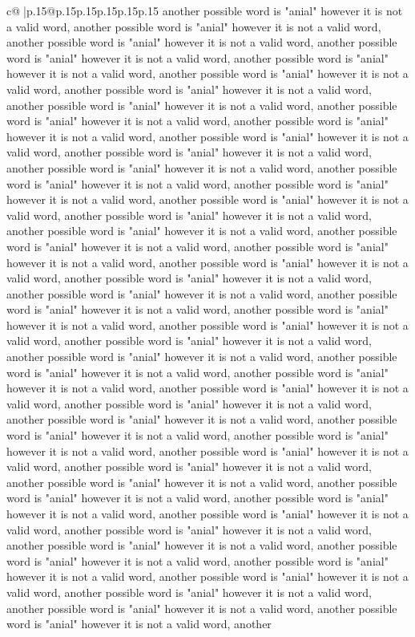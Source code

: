 \documentclass{article}
\begin{document}
{\begin{supertabular}{c@{$\;$}|p{.15\linewidth}@{}p{.15\linewidth}p{.15\linewidth}p{.15\linewidth}p{.15\linewidth}p{.15\linewidth}}
{{{another possible word is "anial" however it is not a valid word, another possible word is "anial" however it is not a valid word, another possible word is "anial" however it is not a valid word, another possible word is "anial" however it is not a valid word, another possible word is "anial" however it is not a valid word, another possible word is "anial" however it is not a valid word, another possible word is "anial" however it is not a valid word, another possible word is "anial" however it is not a valid word, another possible word is "anial" however it is not a valid word, another possible word is "anial" however it is not a valid word, another possible word is "anial" however it is not a valid word, another possible word is "anial" however it is not a valid word, another possible word is "anial" however it is not a valid word, another possible word is "anial" however it is not a valid word, another possible word is "anial" however it is not a valid word, another possible word is "anial" however it is not a valid word, another possible word is "anial" however it is not a valid word, another possible word is "anial" however it is not a valid word, another possible word is "anial" however it is not a valid word, another possible word is "anial" however it is not a valid word, another possible word is "anial" however it is not a valid word, another possible word is "anial" however it is not a valid word, another possible word is "anial" however it is not a valid word, another possible word is "anial" however it is not a valid word, another possible word is "anial" however it is not a valid word, another possible word is "anial" however it is not a valid word, another possible word is "anial" however it is not a valid word, another possible word is "anial" however it is not a valid word, another possible word is "anial" however it is not a valid word, another possible word is "anial" however it is not a valid word, another possible word is "anial" however it is not a valid word, another possible word is "anial" however it is not a valid word, another possible word is "anial" however it is not a valid word, another possible word is "anial" however it is not a valid word, another possible word is "anial" however it is not a valid word, another possible word is "anial" however it is not a valid word, another possible word is "anial" however it is not a valid word, another possible word is "anial" however it is not a valid word, another possible word is "anial" however it is not a valid word, another possible word is "anial" however it is not a valid word, another possible word is "anial" however it is not a valid word, another possible word is "anial" however it is not a valid word, another possible word is "anial" however it is not a valid word, another possible word is "anial" however it is not a valid word, another possible word is "anial" however it is not a valid word, another possible word is "anial" however it is not a valid word, another possible word is "anial" however it is not a valid word, another possible word is "anial" however it is not a valid word, another possible word is "anial" however it is not a valid word, another }}}
\end{supertabular}}
\end{document}
